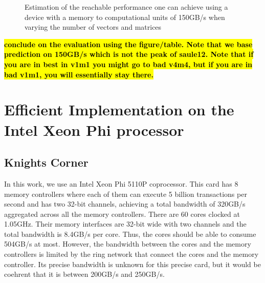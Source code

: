 \documentclass[10pt,conference,compsocconf]{IEEEtran}
\newcommand{\todo}[1]{{\color{red}\textbf{\hl{#1}}\xspace}}
\begin{document}
\begin{figure}
  \centering 
%
  
  \caption{Estimation of the reachable performance one can
      achieve using a device with a memory to computational units of
      150GB/s when varying the number of vectors and matrices}
  \label{fig:perf_predict}
\end{figure}

\todo{conclude on the evaluation using the figure/table. Note that we
  base prediction on 150GB/s which is not the peak of saule12. Note
  that if you are in best in v1m1 you might go to bad v4m4, but if you
  are in bad v1m1, you will essentially stay there.}

\section{Efficient Implementation on the Intel Xeon Phi processor}
\label{sec:impl}

\subsection{Knights Corner}

In this work, we use an Intel Xeon Phi 5110P coprocessor. This card
has 8 memory controllers where each of them can execute 5 billion
transactions per second and has two 32-bit channels, achieving a total
bandwidth of 320GB/s aggregated across all the memory
controllers. There are 60 cores clocked at 1.05GHz. Their memory
interfaces are 32-bit wide with two channels and the total bandwidth
is 8.4GB/s per core. Thus, the cores should be able to consume 504GB/s
at most. However, the bandwidth between the cores and the memory
controllers is limited by the ring network that connect the cores and
the memory controller. Its precise bandwidth is unknown for this
precise card, but it would be coehrent that it is between 200GB/s and
250GB/s.
\end{document}
